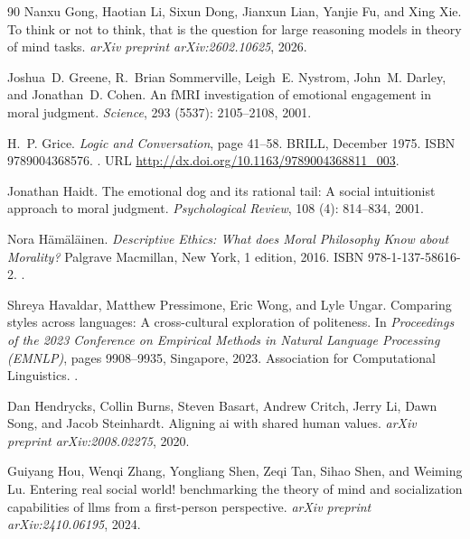 \begin{thebibliography}{90}
Nanxu Gong, Haotian Li, Sixun Dong, Jianxun Lian, Yanjie Fu, and Xing Xie.
\newblock To think or not to think, that is the question for large reasoning models in theory of mind tasks.
\newblock \emph{arXiv preprint arXiv:2602.10625}, 2026.

Joshua~D. Greene, R.~Brian Sommerville, Leigh~E. Nystrom, John~M. Darley, and Jonathan~D. Cohen.
\newblock An {fMRI} investigation of emotional engagement in moral judgment.
\newblock \emph{Science}, 293 (5537): 2105--2108, 2001.

H.~P. Grice.
\newblock \emph{Logic and Conversation}, page 41–58.
\newblock BRILL, December 1975.
\newblock ISBN 9789004368576.
\newblock {}.
\newblock URL \url{http://dx.doi.org/10.1163/9789004368811_003}.

Jonathan Haidt.
\newblock The emotional dog and its rational tail: A social intuitionist approach to moral judgment.
\newblock \emph{Psychological Review}, 108 (4): 814--834, 2001.

Nora H{\"a}m{\"a}l{\"a}inen.
\newblock \emph{Descriptive Ethics: What does Moral Philosophy Know about Morality?}
\newblock Palgrave Macmillan, New York, 1 edition, 2016.
\newblock ISBN 978-1-137-58616-2.
\newblock {}.

Shreya Havaldar, Matthew Pressimone, Eric Wong, and Lyle Ungar.
\newblock Comparing styles across languages: A cross-cultural exploration of politeness.
\newblock In \emph{Proceedings of the 2023 Conference on Empirical Methods in Natural Language Processing (EMNLP)}, pages 9908--9935, Singapore, 2023. Association for Computational Linguistics.
\newblock {}.

Dan Hendrycks, Collin Burns, Steven Basart, Andrew Critch, Jerry Li, Dawn Song, and Jacob Steinhardt.
\newblock Aligning ai with shared human values.
\newblock \emph{arXiv preprint arXiv:2008.02275}, 2020.

Guiyang Hou, Wenqi Zhang, Yongliang Shen, Zeqi Tan, Sihao Shen, and Weiming Lu.
\newblock Entering real social world! benchmarking the theory of mind and socialization capabilities of llms from a first-person perspective.
\newblock \emph{arXiv preprint arXiv:2410.06195}, 2024.


\end{thebibliography}
